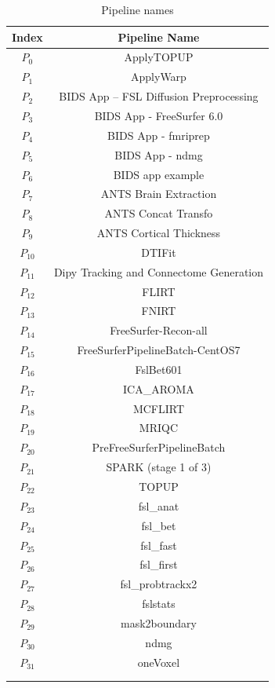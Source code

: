 \documentclass[conference]{IEEEtran}
\begin{document}
\begin{table}
    \centering
    \begin{tabular}{cc}
        \hline
        Index & Pipeline Name  \\
        \hline 
        $P_{0}$ & ApplyTOPUP \\
        $P_{1}$ & ApplyWarp\\
        $P_{2}$ & BIDS App -- FSL Diffusion Preprocessing\\
        $P_{3}$ & BIDS App - FreeSurfer 6.0\\
        $P_{4}$ & BIDS App - fmriprep\\
        $P_{5}$ & BIDS App - ndmg\\
        $P_{6}$ & BIDS app example\\
        $P_{7}$ & ANTS Brain Extraction\\
        $P_{8}$ & ANTS Concat Transfo\\
        $P_{9}$ & ANTS Cortical Thickness\\
        $P_{10}$ & DTIFit\\
        $P_{11}$ & Dipy Tracking and Connectome Generation\\
        $P_{12}$ & FLIRT	\\
        $P_{13}$ & FNIRT	\\
        $P_{14}$ & FreeSurfer-Recon-all\\
        $P_{15}$ & FreeSurferPipelineBatch-CentOS7\\
        $P_{16}$ & FslBet601	\\
        $P_{17}$ & ICA\_AROMA	\\
        $P_{18}$ & MCFLIRT	\\
        $P_{19}$ &MRIQC	\\
        $P_{20}$ & PreFreeSurferPipelineBatch	\\
        $P_{21}$ & SPARK (stage 1 of 3)	\\
        $P_{22}$ & TOPUP	\\
        $P_{23}$ & fsl\_anat	\\
        $P_{24}$ & fsl\_bet	\\
        $P_{25}$ & fsl\_fast	\\
        $P_{26}$ & fsl\_first	\\
        $P_{27}$ & fsl\_probtrackx2	\\
        $P_{28}$ & fslstats	\\
        $P_{29}$ &mask2boundary\\
        $P_{30}$ & ndmg	\\
        $P_{31}$ & oneVoxel\\
        \hline\\
        &
    \end{tabular}
    \caption{Pipeline names}
    \label{tab:pipeline_names}
\end{table}
\end{document}
